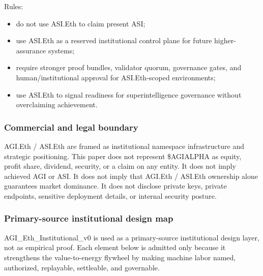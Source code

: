 Rules:

\begin{itemize}
\tightlist
\item
  do not use ASI.Eth to claim present ASI;
\item
  use ASI.Eth as a reserved institutional control plane for future
  higher-assurance systems;
\item
  require stronger proof bundles, validator quorum, governance gates,
  and human/institutional approval for ASI.Eth-scoped environments;
\item
  use ASI.Eth to signal readiness for superintelligence governance
  without overclaiming achievement.
\end{itemize}

\subsubsection{Commercial and legal
boundary}\label{commercial-and-legal-boundary}

AGI.Eth / ASI.Eth are framed as institutional namespace infrastructure
and strategic positioning. This paper does not represent \$AGIALPHA as
equity, profit share, dividend, security, or a claim on any entity. It
does not imply achieved AGI or ASI. It does not imply that AGI.Eth /
ASI.Eth ownership alone guarantees market dominance. It does not
disclose private keys, private endpoints, sensitive deployment details,
or internal security posture.

\subsubsection{Primary-source institutional design
map}\label{primary-source-institutional-design-map}

\begingroup\scriptsize

AGI\_Eth\_Institutional\_v0 is used as a primary-source institutional
design layer, not as empirical proof. Each element below is admitted
only because it strengthens the value-to-energy flywheel by making
machine labor named, authorized, replayable, settleable, and governable.


